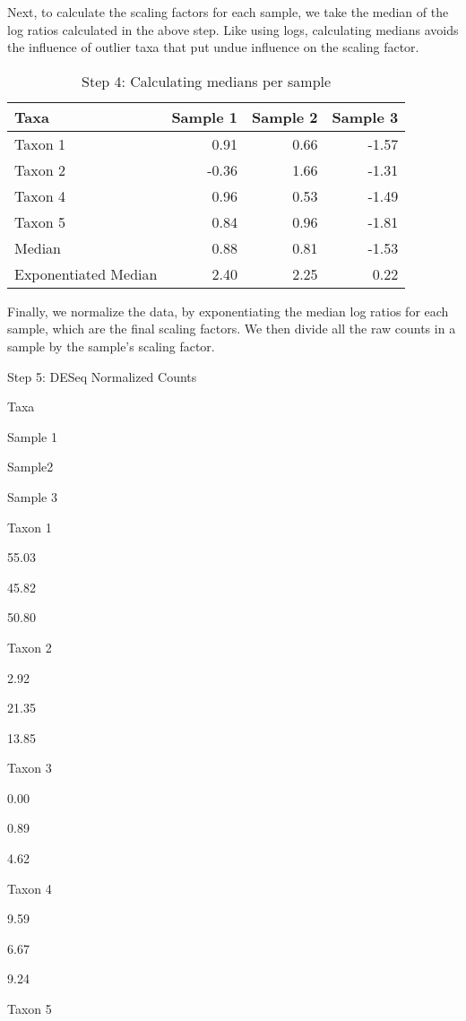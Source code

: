 \documentclass[
]{book}
\begin{document}
Next, to calculate the scaling factors for each sample, we take the median of the log ratios calculated in the above step. Like using logs, calculating medians avoids the influence of outlier taxa that put undue influence on the scaling factor.

\begin{table}

\caption{\label{tab:unnamed-chunk-24}Step 4: Calculating medians per sample}
\centering
\begin{tabular}[t]{l|r|r|r}
\hline
Taxa & Sample 1 & Sample 2 & Sample 3\\
\hline
Taxon 1 & 0.91 & 0.66 & -1.57\\
\hline
Taxon 2 & -0.36 & 1.66 & -1.31\\
\hline
Taxon 4 & 0.96 & 0.53 & -1.49\\
\hline
Taxon 5 & 0.84 & 0.96 & -1.81\\
\hline
Median & 0.88 & 0.81 & -1.53\\
\hline
Exponentiated Median & 2.40 & 2.25 & 0.22\\
\hline
\end{tabular}
\end{table}

Finally, we normalize the data, by exponentiating the median log ratios for each sample, which are the final scaling factors. We then divide all the raw counts in a sample by the sample's scaling factor.

\label{tab:unnamed-chunk-25}Step 5: DESeq Normalized Counts

Taxa

Sample 1

Sample2

Sample 3

Taxon 1

55.03

45.82

50.80

Taxon 2

2.92

21.35

13.85

Taxon 3

0.00

0.89

4.62

Taxon 4

9.59

6.67

9.24

Taxon 5
\end{document}
